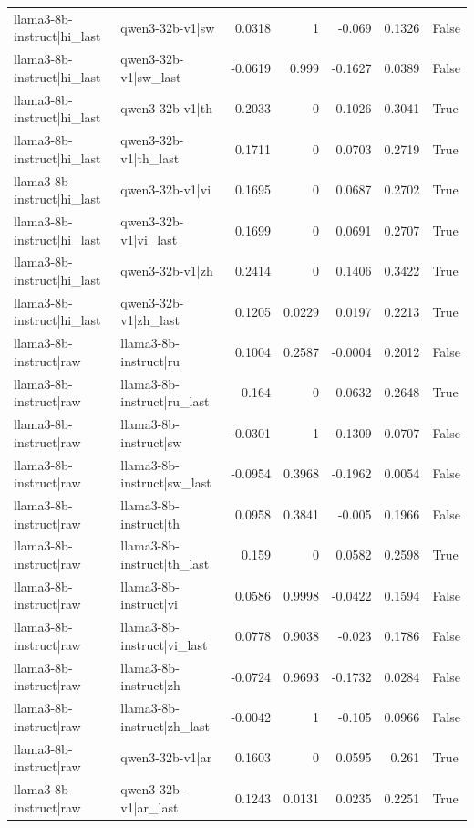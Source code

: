 \begin{table}
\begin{tabular}{l l r r r r l}
llama3-8b-instruct|hi_last & qwen3-32b-v1|sw & 0.0318 & 1 & -0.069 & 0.1326 & False \\
llama3-8b-instruct|hi_last & qwen3-32b-v1|sw_last & -0.0619 & 0.999 & -0.1627 & 0.0389 & False \\
llama3-8b-instruct|hi_last & qwen3-32b-v1|th & 0.2033 & 0 & 0.1026 & 0.3041 & True \\
llama3-8b-instruct|hi_last & qwen3-32b-v1|th_last & 0.1711 & 0 & 0.0703 & 0.2719 & True \\
llama3-8b-instruct|hi_last & qwen3-32b-v1|vi & 0.1695 & 0 & 0.0687 & 0.2702 & True \\
llama3-8b-instruct|hi_last & qwen3-32b-v1|vi_last & 0.1699 & 0 & 0.0691 & 0.2707 & True \\
llama3-8b-instruct|hi_last & qwen3-32b-v1|zh & 0.2414 & 0 & 0.1406 & 0.3422 & True \\
llama3-8b-instruct|hi_last & qwen3-32b-v1|zh_last & 0.1205 & 0.0229 & 0.0197 & 0.2213 & True \\
llama3-8b-instruct|raw & llama3-8b-instruct|ru & 0.1004 & 0.2587 & -0.0004 & 0.2012 & False \\
llama3-8b-instruct|raw & llama3-8b-instruct|ru_last & 0.164 & 0 & 0.0632 & 0.2648 & True \\
llama3-8b-instruct|raw & llama3-8b-instruct|sw & -0.0301 & 1 & -0.1309 & 0.0707 & False \\
llama3-8b-instruct|raw & llama3-8b-instruct|sw_last & -0.0954 & 0.3968 & -0.1962 & 0.0054 & False \\
llama3-8b-instruct|raw & llama3-8b-instruct|th & 0.0958 & 0.3841 & -0.005 & 0.1966 & False \\
llama3-8b-instruct|raw & llama3-8b-instruct|th_last & 0.159 & 0 & 0.0582 & 0.2598 & True \\
llama3-8b-instruct|raw & llama3-8b-instruct|vi & 0.0586 & 0.9998 & -0.0422 & 0.1594 & False \\
llama3-8b-instruct|raw & llama3-8b-instruct|vi_last & 0.0778 & 0.9038 & -0.023 & 0.1786 & False \\
llama3-8b-instruct|raw & llama3-8b-instruct|zh & -0.0724 & 0.9693 & -0.1732 & 0.0284 & False \\
llama3-8b-instruct|raw & llama3-8b-instruct|zh_last & -0.0042 & 1 & -0.105 & 0.0966 & False \\
llama3-8b-instruct|raw & qwen3-32b-v1|ar & 0.1603 & 0 & 0.0595 & 0.261 & True \\
llama3-8b-instruct|raw & qwen3-32b-v1|ar_last & 0.1243 & 0.0131 & 0.0235 & 0.2251 & True \\

\end{tabular}
\end{table}
